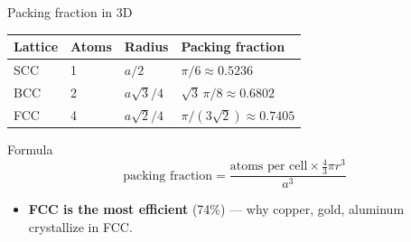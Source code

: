 \documentclass[aspectratio=169]{beamer}
\begin{document}
\begin{frame}{Packing fraction in 3D}
  \begin{table}
    \small
    \begin{tabular}{@{}llll@{}}
      \toprule
      Lattice & Atoms & Radius & Packing fraction \\
      \midrule
      SCC & 1 & $a/2$ & $\pi/6 \approx 0.5236$ \\
      BCC & 2 & $a\sqrt{3}/4$ & $\sqrt{3}\,\pi/8 \approx 0.6802$ \\
      FCC & 4 & $a\sqrt{2}/4$ & $\pi/(3\sqrt{2}) \approx 0.7405$ \\
      \bottomrule
    \end{tabular}
  \end{table}
  \vspace{0.3cm}
  \begin{block}{Formula}
    \[
      \text{packing fraction} =
      \frac{\text{atoms per cell} \times \frac{4}{3}\pi r^3}{a^3}
    \]
  \end{block}
  \begin{itemize}
    \item \textbf{FCC is the most efficient} (74\%) --- why copper, gold,
          aluminum crystallize in FCC.
  \end{itemize}
\end{frame}
\end{document}
